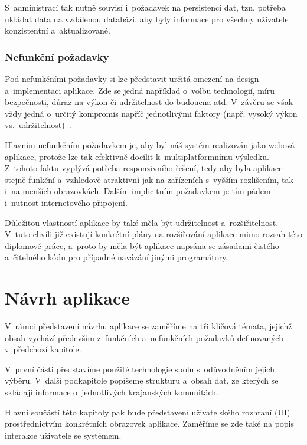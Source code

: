S~administrací tak nutně souvisí i~požadavek na persistenci dat, tzn. potřeba ukládat data na vzdálenou databázi, aby byly informace pro všechny uživatele konzistentní a~aktualizované.

\hypertarget{nefunkux10dnuxed-poux17eadavky}{%
\subsection{Nefunkční požadavky}\label{nefunkux10dnuxed-poux17eadavky}}

Pod nefunkčními požadavky si lze představit určitá omezení na design a~implementaci aplikace. Zde se jedná například o~volbu technologií, míru bezpečnosti, důraz na výkon či udržitelnost do budoucna atd. V~závěru se však vždy jedná o~určitý kompromis napříč jednotlivými faktory (např. vysoký výkon vs.~udržitelnost)~\parencite{Gorton2006}.

Hlavním nefunkčním požadavkem je, aby byl náš systém realizován jako webová aplikace, protože lze tak efektivně docílit k~multiplatformnímu výsledku. Z~tohoto faktu vyplývá potřeba responzivního řešení, tedy aby byla aplikace stejně funkční a~vzhledově atraktivní jak na zařízeních s~vyšším rozlišením, tak i~na menších obrazovkách. Dalším implicitním požadavkem je tím pádem i~nutnost internetového připojení.

Důležitou vlastností aplikace by také měla být udržitelnost a~rozšiřitelnost. V~tuto chvíli již existují konkrétní plány na rozšiřování aplikace mimo rozsah této diplomové práce, a~proto by měla být aplikace napsána se zásadami čistého a~čitelného kódu pro případné navázání jinými programátory.

\hypertarget{nuxe1vrh-aplikace}{%
\chapter{Návrh aplikace}\label{nuxe1vrh-aplikace}}

V~rámci představení návrhu aplikace se zaměříme na tři klíčová témata, jejichž obsah vychází především z~funkčních a~nefunkčních požadavků definovaných v~předchozí kapitole.

V~první části představíme použité technologie spolu s~odůvodněním jejich výběru. V~další podkapitole popíšeme strukturu a~obsah dat, ze kterých se skládají informace o~jednotlivých krajanských komunitách.

Hlavní součástí této kapitoly pak bude představení uživatelského rozhraní (UI) prostřednictvím konkrétních obrazovek aplikace. Zaměříme se zde také na popis interakce uživatele se systémem.

